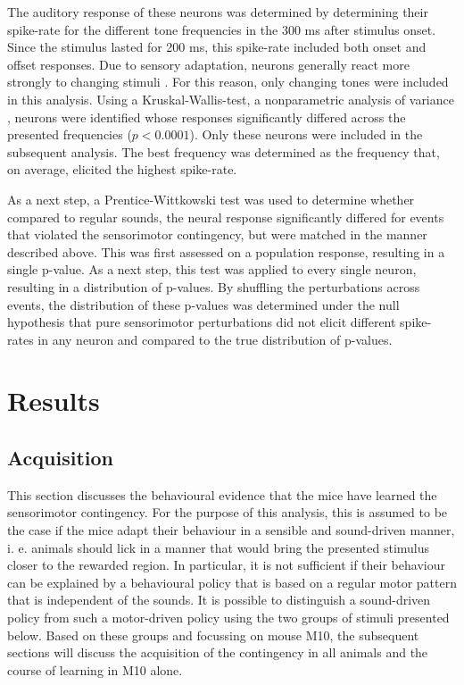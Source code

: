 \documentclass[]{report}
\theoremstyle{definition}
\theoremstyle{definition}
\theoremstyle{definition}
\theoremstyle{remark}
\begin{document}
The auditory response of these neurons was determined by determining
their spike-rate for the different tone frequencies in the 300 ms after
stimulus onset. Since the stimulus lasted for 200 ms, this spike-rate
included both onset and offset responses. Due to sensory adaptation,
neurons generally react more strongly to changing stimuli
\citep{westerman1984rapid}. For this reason, only changing tones were
included in this analysis. Using a Kruskal-Wallis-test, a nonparametric
analysis of variance \citep{kruskal1952}, neurons were identified whose
responses significantly differed across the presented frequencies
(\(p<0.0001\)). Only these neurons were included in the subsequent
analysis. The best frequency was determined as the frequency that, on
average, elicited the highest spike-rate.

As a next step, a Prentice-Wittkowski test was used to determine whether
compared to regular sounds, the neural response significantly differed
for events that violated the sensorimotor contingency, but were matched
in the manner described above. This was first assessed on a population
response, resulting in a single p-value. As a next step, this test was
applied to every single neuron, resulting in a distribution of p-values.
By shuffling the perturbations across events, the distribution of these
p-values was determined under the null hypothesis that pure sensorimotor
perturbations did not elicit different spike-rates in any neuron and
compared to the true distribution of p-values.

\hypertarget{results}{%
\chapter{Results}\label{results}}

\hypertarget{acquisition}{%
\section{Acquisition}\label{acquisition}}

This section discusses the behavioural evidence that the mice have
learned the sensorimotor contingency. For the purpose of this analysis,
this is assumed to be the case if the mice adapt their behaviour in a
sensible and sound-driven manner, i. e. animals should lick in a manner
that would bring the presented stimulus closer to the rewarded region.
In particular, it is not sufficient if their behaviour can be explained
by a behavioural policy that is based on a regular motor pattern that is
independent of the sounds. It is possible to distinguish a sound-driven
policy from such a motor-driven policy using the two groups of stimuli
presented below. Based on these groups and focussing on mouse M10, the
subsequent sections will discuss the acquisition of the contingency in
all animals and the course of learning in M10 alone.
\end{document}
